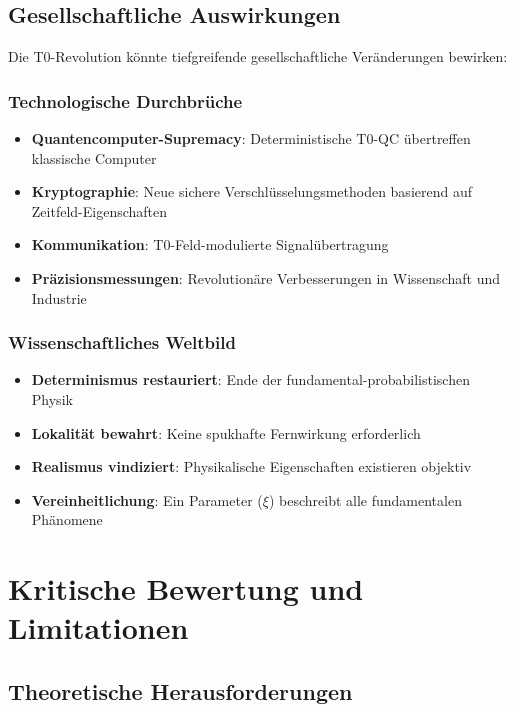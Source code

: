 	\subsection{Gesellschaftliche Auswirkungen}
	
	Die T0-Revolution könnte tiefgreifende gesellschaftliche Veränderungen bewirken:
	
	\subsubsection{Technologische Durchbrüche}
	
	\begin{itemize}
		\item \textbf{Quantencomputer-Supremacy}: Deterministische T0-QC übertreffen klassische Computer
		\item \textbf{Kryptographie}: Neue sichere Verschlüsselungsmethoden basierend auf Zeitfeld-Eigenschaften
		\item \textbf{Kommunikation}: T0-Feld-modulierte Signalübertragung
		\item \textbf{Präzisionsmessungen}: Revolutionäre Verbesserungen in Wissenschaft und Industrie
	\end{itemize}
	
	\subsubsection{Wissenschaftliches Weltbild}
	
	\begin{itemize}
		\item \textbf{Determinismus restauriert}: Ende der fundamental-probabilistischen Physik
		\item \textbf{Lokalität bewahrt}: Keine spukhafte Fernwirkung erforderlich
		\item \textbf{Realismus vindiziert}: Physikalische Eigenschaften existieren objektiv
		\item \textbf{Vereinheitlichung}: Ein Parameter ($\xi$) beschreibt alle fundamentalen Phänomene
	\end{itemize}
	
	\section{Kritische Bewertung und Limitationen}
	
	\subsection{Theoretische Herausforderungen}
	
